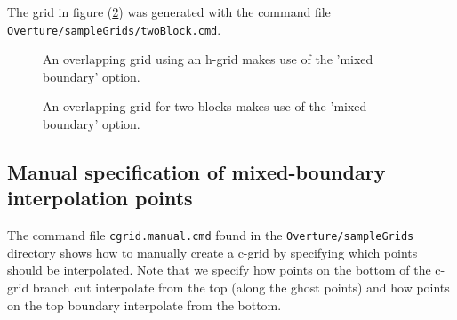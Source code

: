 \documentclass[xcolor=rgb,svgnames,dvipsnames]{article}
\newcommand{\figures}{\homeHenshaw/OvertureFigures}
\begin{document}
The grid in figure (\ref{fig:twoBlock}) was generated with the command file
{\tt Overture/sampleGrids/twoBlock.cmd}.

{
\newcommand{\figWidthd}{11cm}
\newcommand{\trimfig}[2]{\trimPlot{#1}{#2}{.0}{.0}{.30}{.30}}
\begin{figure}[hbt]
\begin{center}
\end{center}
  \caption{An overlapping grid using an h-grid makes use of the 'mixed boundary' option.}  \label{fig:hgrid}
\end{figure}
}
% 
{
\newcommand{\figWidthd}{10cm}
\newcommand{\trimfig}[2]{\trimPlot{#1}{#2}{.0}{.0}{.10}{.20}}
\begin{figure}[hbt]
\begin{center}
\end{center}
  \caption{An overlapping grid for two blocks makes use of the 'mixed boundary' option.}  \label{fig:twoBlock}
\end{figure}
}

\subsection{Manual specification of mixed-boundary interpolation points}

The command file {\tt cgrid.manual.cmd} found in the
{\tt Overture\-/sampleGrids} directory shows how to manually create a c-grid by specifying
which points should be interpolated.
Note that we specify how points on the bottom of the c-grid branch cut
interpolate from the top (along the ghost points)
and how points on the top boundary interpolate from the bottom.
\end{document}
